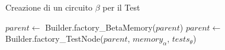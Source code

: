 
\begin{algorithm}
\caption{Creazione di un circuito $\beta$ per il Test}\label{alg:builder-makeTest}
\begin{algorithmic}
\State $parent\gets$ Builder.factory\_BetaMemory($parent$)
\State $parent\gets$ Builder.factory\_TestNode($parent$, $memory_\alpha$, $tests_\theta$)
\State {}
\EndFunction
\end{algorithmic}
\end{algorithm}

